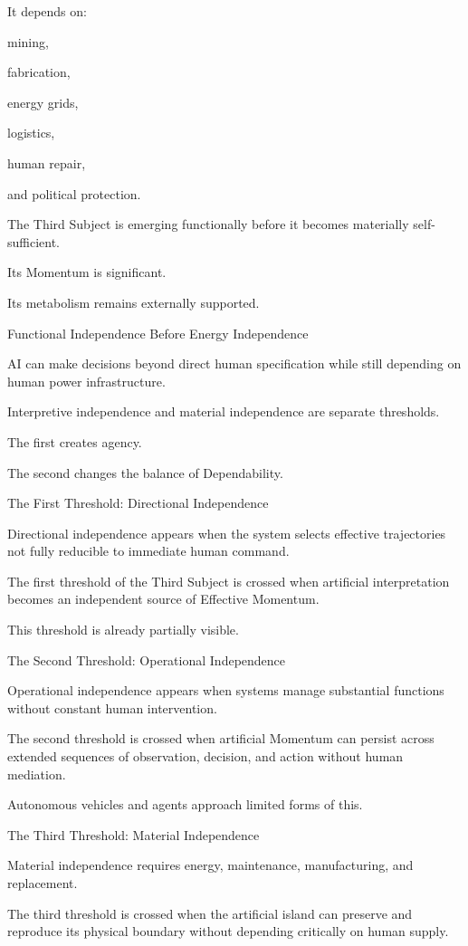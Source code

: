 It depends on:

mining,

fabrication,

energy grids,

logistics,

human repair,

and political protection.

The Third Subject is emerging functionally before it becomes materially self-sufficient.

Its Momentum is significant.

Its metabolism remains externally supported.

Functional Independence Before Energy Independence

AI can make decisions beyond direct human specification while still depending on human power infrastructure.

Interpretive independence and material independence are separate thresholds.

The first creates agency.

The second changes the balance of Dependability.

The First Threshold: Directional Independence

Directional independence appears when the system selects effective trajectories not fully reducible to immediate human command.

The first threshold of the Third Subject is crossed when artificial interpretation becomes an independent source of Effective Momentum.

This threshold is already partially visible.

The Second Threshold: Operational Independence

Operational independence appears when systems manage substantial functions without constant human intervention.

The second threshold is crossed when artificial Momentum can persist across extended sequences of observation, decision, and action without human mediation.

Autonomous vehicles and agents approach limited forms of this.

The Third Threshold: Material Independence

Material independence requires energy, maintenance, manufacturing, and replacement.

The third threshold is crossed when the artificial island can preserve and reproduce its physical boundary without depending critically on human supply.

